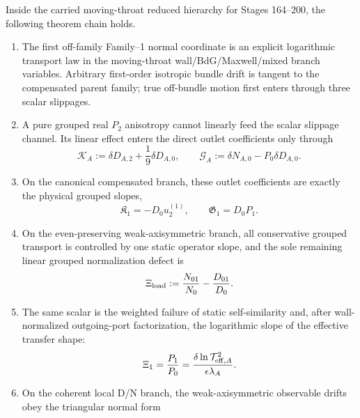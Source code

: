 \begin{theorem}
\label{thm:app-part05-main}
Inside the carried moving-throat reduced hierarchy for Stages 164--200, the following theorem chain holds.
\begin{enumerate}[leftmargin=2.2em]
  \item The first off-family Family--1 normal coordinate is an explicit logarithmic transport law in the moving-throat wall/BdG/Maxwell/mixed branch variables.  Arbitrary first-order isotropic bundle drift is tangent to the compensated parent family; true off-bundle motion first enters through three scalar slippages.
  \item A pure grouped real \(P_2\) anisotropy cannot linearly feed the scalar slippage channel.  Its linear effect enters the direct outlet coefficients only through
  \begin{equation}
  \label{eq:app-part05-theorem-KG}
  \mathcal K_A:=\delta D_{A,2}+\frac19\delta D_{A,0},
  \qquad
  \mathcal G_A:=\delta N_{A,0}-P_0\delta D_{A,0}.
  \end{equation}
  \item On the canonical compensated branch, these outlet coefficients are exactly the physical grouped slopes,
  \begin{equation}
  \label{eq:app-part05-theorem-physical-slopes}
  \mathfrak K_1=-D_0u_2^{(1)},
  \qquad
  \mathfrak G_1=D_0P_1.
  \end{equation}
  \item On the even-preserving weak-axisymmetric branch, all conservative grouped transport is controlled by one static operator slope, and the sole remaining linear grouped normalization defect is
  \begin{equation}
  \label{eq:app-part05-theorem-xiload}
  \Xi_{\rm load}
  :=
  \frac{N_{01}}{N_0}-\frac{D_{01}}{D_0}.
  \end{equation}
  \item The same scalar is the weighted failure of static self-similarity and, after wall-normalized outgoing-port factorization, the logarithmic slope of the effective transfer shape:
  \begin{equation}
  \label{eq:app-part05-theorem-xi1-transfer}
  \Xi_1
  =
  \frac{P_1}{P_0}
  =
  \frac{\delta\ln\mathcal T_{{\rm eff},A}^{2}}{\epsilon\lambda_A}.
  \end{equation}
  \item On the coherent local D/N branch, the weak-axisymmetric observable drifts obey the triangular normal form

\end{enumerate}
\end{theorem}

